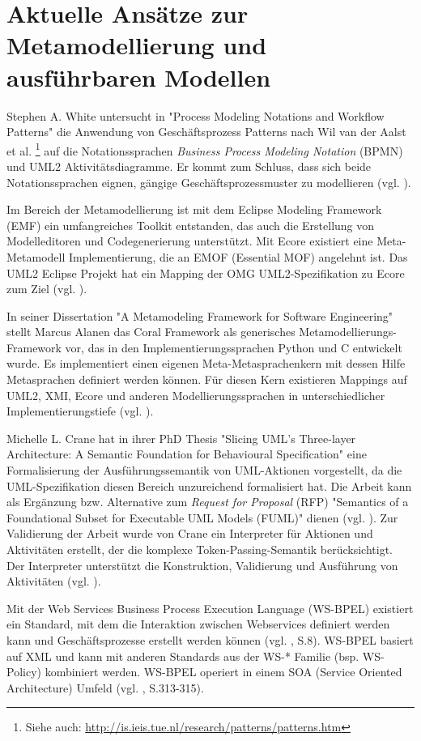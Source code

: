 \chapter{Aktuelle Ansätze zur Metamodellierung und ausführbaren Modellen}\label{state-of-art}
Stephen A. White untersucht in "Process Modeling Notations and Workflow Patterns" die Anwendung von Geschäftsprozess Patterns nach Wil van der Aalst et al.
\footnote{Siehe auch: \url{http://is.ieis.tue.nl/research/patterns/patterns.htm}}
auf die Notationssprachen \emph{Business Process Modeling Notation} (BPMN) und UML2 Aktivitätsdiagramme. Er kommt zum Schluss, dass sich beide Notationssprachen eignen, gängige Geschäftsprozessmuster zu modellieren (vgl. \citep{White2004}).

Im Bereich der Metamodellierung ist mit dem Eclipse Modeling Framework (EMF) ein umfangreiches Toolkit entstanden, das auch die Erstellung von Modelleditoren und Codegenerierung unterstützt. Mit Ecore existiert eine Meta-Metamodell Implementierung, die an EMOF (Essential MOF) angelehnt ist. Das UML2 Eclipse Projekt hat ein Mapping der OMG UML2-Spezifikation zu Ecore zum Ziel (vgl. \citep{EMF2009}).

In seiner Dissertation "A Metamodeling Framework for Software Engineering" stellt Marcus Alanen das Coral Framework als generisches Meta\-mo\-del\-lierungs-Framework vor, das in den Implementierungssprachen Python und C entwickelt wurde. Es implementiert einen eigenen Meta-Metasprachenkern mit dessen Hilfe Metasprachen definiert werden können. Für diesen Kern existieren Mappings auf UML2, XMI, Ecore und anderen Modellierungssprachen in unterschiedlicher Implementierungstiefe (vgl. \citep{Alanen2007}).

Michelle L. Crane hat in ihrer PhD Thesis "Slicing UML’s Three-layer Architecture: A Semantic Foundation for Behavioural Specification" eine Formalisierung der Ausführungssemantik von UML-Aktionen vorgestellt, da die UML-Spezifikation diesen Bereich unzureichend formalisiert hat. Die Arbeit kann als Ergänzung bzw. Alternative zum \emph{Request for Proposal} (RFP) "Semantics of a Foundational Subset for Executable UML Models (FUML)" dienen (vgl. \citep{OMG2008}). Zur Validierung der Arbeit wurde von Crane ein Interpreter für Aktionen und Aktivitäten erstellt, der die komplexe Token-Passing-Semantik berücksichtigt. Der Interpreter unterstützt die Konstruktion, Validierung und Ausführung von Aktivitäten (vgl. \citep{Crane2009}).

Mit der Web Services Business Process Execution Language (WS-BPEL) existiert ein Standard, mit dem die Interaktion zwischen Webservices definiert werden kann und Geschäftsprozesse erstellt werden können (vgl. \citep{OASIS2007}, S.8). WS-BPEL basiert auf XML und kann mit anderen Standards aus der WS-* Familie (bsp. WS-Policy) kombiniert werden. WS-BPEL operiert in einem SOA (Service Oriented Architecture) Umfeld (vgl. \citep{BPEL1}, S.313-315).

